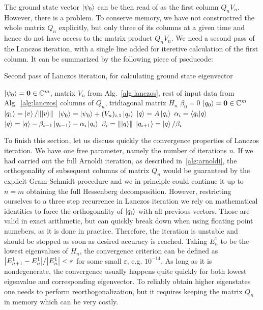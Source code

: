 The ground state vector \(\ket{\psi_0}\) can be then read of as the first column \(Q_n V_n\). However, there is a problem.
To conserve memory, we have not constructred the whole matrix \(Q_n\) explicitly, but only three of its columns 
at a given time and hence do not have access to the matrix product \(Q_n V_n\). We need a second pass of the Lanczos
iteration, with a single line added for iteretive calculation of the first column. It can be summarized by the
following piece of pseducode:

\begin{algorithm}
	\algrenewcommand{}
	\algrenewcommand{}
	\caption{Second pass of Lanczos iteration, for calculating ground state eigenvector}
	\label{alg:lanczos_second_pass}
	\begin{algorithmic}[1]
	\Require \(\ket{\psi_0} = \vectorbold{0} \in \CC^m\), matrix \(V_n\) from Alg.~\ref{alg:lanczos}, rest of input data from Alg.~\ref{alg:lanczos}
		\Ensure columns of \(Q_n\), tridiagonal matrix \(H_n\)
		\State \(\beta_0 = 0\)
		\State \(\ket{q_0} = \vectorbold{0} \in \CC^m\)
		\State \(\ket{q_1} = \ket{v}/\norm*{\ket{v}}\)
			\State \(\ket{\psi_0} = \ket{\psi_0} + (V_n)_{i,1}\ket{q_i}\) 
			\State \(\ket{q} = A\ket{q_i}\)
			\State \(\alpha_i = \braket{q_i}{q}\)
			\State \(\ket{q} = \ket{q} - \beta_{i-1}\ket{q_{i-1}} - \alpha_i \ket{q_i}\)
			\State \(\beta_i = \norm{\ket{q}} \) 
			\State \(\ket{q_{i+1}} = \ket{q}/\beta_i \)
		\EndFor
	\end{algorithmic}
\end{algorithm}

To finish this section, let us discuss quickly the convergence properties of Lanczos iteration. We have one free parameter,
namely the number of iterations \(n\). If we had carried out the full Arnoldi iteration, as described in~\ref{alg:arnoldi},
the orthogonality of subsequent columns of matrix \(Q_n\) would be guaranteed by the explicit Gram-Schmidt procedure
and we in principle could continue it up to \(n = m\) obtaining the full Hessenberg decomposition. However, 
restricting ourselves to a three step recurrence in Lanczos iteration we rely on mathematical identities to
force the orthogonality of \(\ket{q_i}\) with all previous vectors. Those are valid in exact arithmetic, but can
quickly break down when using floating point numebers, as it is done in practice. Therefore, the iteration is unstable and
should be stopped as soon as desired accuracy is reached. Taking \(E_n^1\) to be the lowest eigenvalues of
\(H_n\), the convergence criterion can be defined as \(\abs{E_{n+1}^1 - E_{n}^1}/\abs{E_n^1} < \varepsilon\) for some
small \(\varepsilon\), e.g. \(10^{-14}\). As long as it is nondegenerate, the convergence usually happens quite quickly for
both lowest eigenvalue and corresponding eigenvector. To reliably obtain higher eigenstates one needs to perform
reorthogonalization, but it requires keeping the matrix \(Q_n\) in memory which can be very costly.

